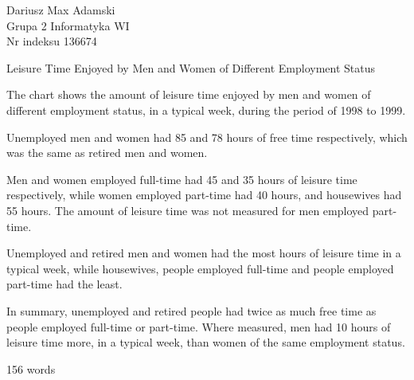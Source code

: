 \documentclass[12pt]{article}
\begin{document}

\begin{flushleft} 
	Dariusz Max Adamski \\
	Grupa 2 Informatyka WI\\
	Nr indeksu 136674
\end{flushleft}

\begin{center} 
	\vspace{0.8cm} \Large 
	Leisure Time Enjoyed by Men and Women of Different Employment Status
	\vspace{0.5cm}
\end{center}

The chart shows the amount of leisure time enjoyed by men and women of different employment status, in a typical week, during the period of 1998 to 1999.

Unemployed men and women had 85 and 78 hours of free time respectively, which was the same as retired men and women.

Men and women employed full-time had 45 and 35 hours of leisure time respectively, while women employed part-time had 40 hours, and housewives had 55 hours. The amount of leisure time was not measured for men employed part-time.

Unemployed and retired men and women had the most hours of leisure time in a typical week, while housewives, people employed full-time and people employed part-time had the least.

In summary, unemployed and retired people had twice as much free time as people employed full-time or part-time. Where measured, men had 10 hours of leisure time more, in a typical week, than women of the same employment status. 

156 words
\end{document}
